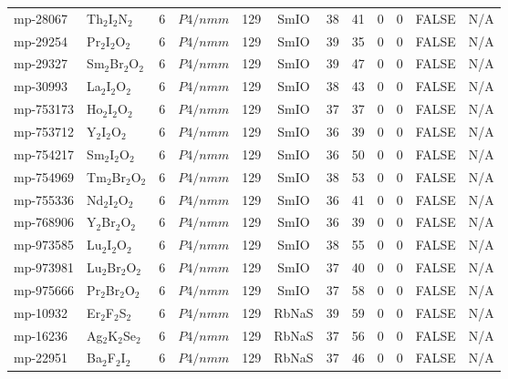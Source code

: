 {\begin{longtable}{llcccccccccc}
    mp-28067 & Th$_{2}$I$_{2}$N$_{2}$ & 6     & $P4/nmm$ & 129   & SmIO  & 38    & 41    & 0     & 0     & FALSE & N/A \\
    mp-29254 & Pr$_{2}$I$_{2}$O$_{2}$ & 6     & $P4/nmm$ & 129   & SmIO  & 39    & 35    & 0     & 0     & FALSE & N/A \\
    mp-29327 & Sm$_{2}$Br$_{2}$O$_{2}$ & 6     & $P4/nmm$ & 129   & SmIO  & 39    & 47    & 0     & 0     & FALSE & N/A \\
    mp-30993 & La$_{2}$I$_{2}$O$_{2}$ & 6     & $P4/nmm$ & 129   & SmIO  & 38    & 43    & 0     & 0     & FALSE & N/A \\
    mp-753173 & Ho$_{2}$I$_{2}$O$_{2}$ & 6     & $P4/nmm$ & 129   & SmIO  & 37    & 37    & 0     & 0     & FALSE & N/A \\
    mp-753712 & Y$_{2}$I$_{2}$O$_{2}$ & 6     & $P4/nmm$ & 129   & SmIO  & 36    & 39    & 0     & 0     & FALSE & N/A \\
    mp-754217 & Sm$_{2}$I$_{2}$O$_{2}$ & 6     & $P4/nmm$ & 129   & SmIO  & 36    & 50    & 0     & 0     & FALSE & N/A \\
    mp-754969 & Tm$_{2}$Br$_{2}$O$_{2}$ & 6     & $P4/nmm$ & 129   & SmIO  & 38    & 53    & 0     & 0     & FALSE & N/A \\
    mp-755336 & Nd$_{2}$I$_{2}$O$_{2}$ & 6     & $P4/nmm$ & 129   & SmIO  & 36    & 41    & 0     & 0     & FALSE & N/A \\
    mp-768906 & Y$_{2}$Br$_{2}$O$_{2}$ & 6     & $P4/nmm$ & 129   & SmIO  & 36    & 39    & 0     & 0     & FALSE & N/A \\
    mp-973585 & Lu$_{2}$I$_{2}$O$_{2}$ & 6     & $P4/nmm$ & 129   & SmIO  & 38    & 55    & 0     & 0     & FALSE & N/A \\
    mp-973981 & Lu$_{2}$Br$_{2}$O$_{2}$ & 6     & $P4/nmm$ & 129   & SmIO  & 37    & 40    & 0     & 0     & FALSE & N/A \\
    mp-975666 & Pr$_{2}$Br$_{2}$O$_{2}$ & 6     & $P4/nmm$ & 129   & SmIO  & 37    & 58    & 0     & 0     & FALSE & N/A \\
    mp-10932 & Er$_{2}$F$_{2}$S$_{2}$ & 6     & $P4/nmm$ & 129   & RbNaS & 39    & 59    & 0     & 0     & FALSE & N/A \\
    mp-16236 & Ag$_{2}$K$_{2}$Se$_{2}$ & 6     & $P4/nmm$ & 129   & RbNaS & 37    & 56    & 0     & 0     & FALSE & N/A \\
    mp-22951 & Ba$_{2}$F$_{2}$I$_{2}$ & 6     & $P4/nmm$ & 129   & RbNaS & 37    & 46    & 0     & 0     & FALSE & N/A \\

\end{longtable}}
